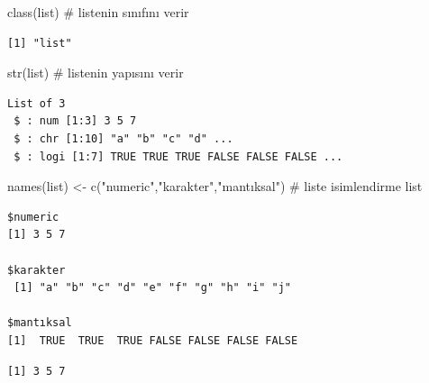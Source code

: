 \documentclass[
  letterpaper,
  DIV=11,
  numbers=noendperiod]{scrreprt}
\newenvironment{Shaded}{\begin{snugshade}}{\end{snugshade}}
\newcommand{\CommentTok}[1]{\textcolor[rgb]{0.37,0.37,0.37}{#1}}
\newcommand{\FunctionTok}[1]{\textcolor[rgb]{0.28,0.35,0.67}{#1}}
\newcommand{\NormalTok}[1]{\textcolor[rgb]{0.00,0.23,0.31}{#1}}
\newcommand{\OtherTok}[1]{\textcolor[rgb]{0.00,0.23,0.31}{#1}}
\newcommand{\SpecialCharTok}[1]{\textcolor[rgb]{0.37,0.37,0.37}{#1}}
\newcommand{\StringTok}[1]{\textcolor[rgb]{0.13,0.47,0.30}{#1}}
\begin{document}
\begin{Shaded}
\begin{Highlighting}[]
\FunctionTok{class}\NormalTok{(list) }\CommentTok{\# listenin sınıfını verir}
\end{Highlighting}
\end{Shaded}

\begin{verbatim}
[1] "list"
\end{verbatim}

\begin{Shaded}
\begin{Highlighting}[]
\FunctionTok{str}\NormalTok{(list) }\CommentTok{\# listenin yapısını verir}
\end{Highlighting}
\end{Shaded}

\begin{verbatim}
List of 3
 $ : num [1:3] 3 5 7
 $ : chr [1:10] "a" "b" "c" "d" ...
 $ : logi [1:7] TRUE TRUE TRUE FALSE FALSE FALSE ...
\end{verbatim}

\begin{Shaded}
\begin{Highlighting}[]
\FunctionTok{names}\NormalTok{(list) }\OtherTok{\textless{}{-}} \FunctionTok{c}\NormalTok{(}\StringTok{"numeric"}\NormalTok{,}\StringTok{"karakter"}\NormalTok{,}\StringTok{"mantıksal"}\NormalTok{) }\CommentTok{\# liste isimlendirme}
\NormalTok{list}
\end{Highlighting}
\end{Shaded}

\begin{verbatim}
$numeric
[1] 3 5 7

$karakter
 [1] "a" "b" "c" "d" "e" "f" "g" "h" "i" "j"

$mantıksal
[1]  TRUE  TRUE  TRUE FALSE FALSE FALSE FALSE
\end{verbatim}

\begin{Shaded}
\end{Shaded}

\begin{verbatim}
[1] 3 5 7
\end{verbatim}

\begin{Shaded}
\end{Shaded}
\end{document}
